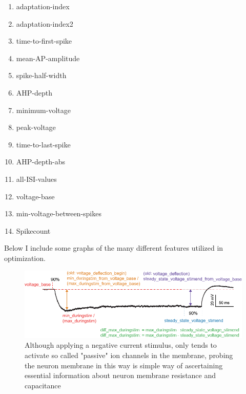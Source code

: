 \begin{enumerate}
\item adaptation-index
\item adaptation-index2
\item time-to-first-spike
\item mean-AP-amplitude
\item spike-half-width
\item AHP-depth
\item minimum-voltage
\item peak-voltage
\item time-to-last-spike
\item AHP-depth-abs
\item all-ISI-values
\item voltage-base
\item min-voltage-between-spikes
\item Spikecount
\end{enumerate}


Below I include some graphs of the many different features utilized in optimization.

\begin{figure}
    \centering
    \includegraphics{figures/voltage_features.png}
    \caption[passive membrane properties probed with a negative amplitude current stimulus]{Although applying a negative current stimulus, only tends to activate so called "passive" ion channels in the membrane, probing the neuron membrane in this way is simple way of ascertaining essential information about neuron membrane resistance and capacitance}
    \label{fig:voltage_figures}
\end{figure}





